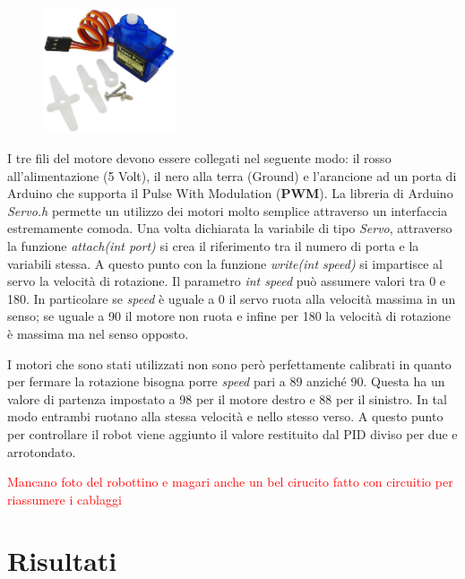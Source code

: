 \documentclass[twoside,twocolumn]{article}
\begin{document}
\begin{figure}[h]
	\centering
	\includegraphics[width=0.35\textwidth]{immagini/servo}
	\caption{}
	\label{fig:servo}
\end{figure}

I tre fili del motore devono essere collegati nel seguente modo: il rosso all'alimentazione (5 Volt), il nero alla terra (Ground) e l'arancione ad un porta di Arduino che supporta il Pulse With Modulation (\textbf{PWM}). La libreria di Arduino \textit{Servo.h} permette un utilizzo dei motori molto semplice attraverso un interfaccia estremamente comoda. Una volta dichiarata la variabile di tipo \textit{Servo}, attraverso la funzione \textit{attach(int port)} si crea il riferimento tra il numero di porta e la variabili stessa. A questo punto con la funzione \textit{write(int speed)} si impartisce al servo la velocità di rotazione. Il parametro \textit{int speed} può assumere valori tra 0 e 180. In particolare se \textit{speed} è uguale a 0 il servo ruota alla velocità massima in un senso; se uguale a 90 il motore non ruota e infine per 180 la velocità di rotazione è massima ma nel senso opposto. 

I motori che sono stati utilizzati non sono però perfettamente calibrati in quanto per fermare la rotazione bisogna porre \textit{speed} pari a 89 anziché 90. Questa ha un valore di partenza impostato a 98 per il motore destro e 88 per il sinistro. In tal modo entrambi ruotano alla stessa velocità e nello stesso verso. A questo punto per controllare il robot viene aggiunto il valore restituito dal PID diviso per due e arrotondato. 

\textcolor{red}{Mancano foto del robottino e magari anche un bel cirucito fatto con circuitio per riassumere i cablaggi}

\section{Risultati}
\end{document}
